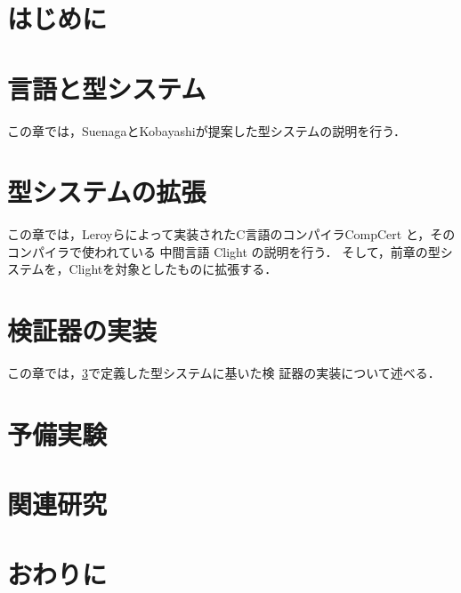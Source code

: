 \documentclass[master]{kuisthesis}
\date{平成28年2月8日}
\begin{document}
\maketitle


\tableofcontents
\section{はじめに}
\label{section}


\section{言語と型システム}
\label{section2}
この章では，SuenagaとKobayashiが提案した型システムの説明を行う．


\section{型システムの拡張}
\label{section3}

この章では，Leroyらによって実装されたC言語のコンパイラCompCert
\cite {DBLP:journals/cacm/Leroy09}と，そのコンパイラで使われている
中間言語 Clight \cite {DBLP:journals/jar/BlazyL09}の説明を行う．
そして，前章の型システムを，Clightを対象としたものに拡張する．




\section{検証器の実装}
\label{section4}この章では，\ref{section3}で定義した型システムに基いた検
証器の実装について述べる．





\section{予備実験}
\label{section5}


\section{関連研究}
\label{section6}


\section{おわりに}
\label{section7}

\end{document}
